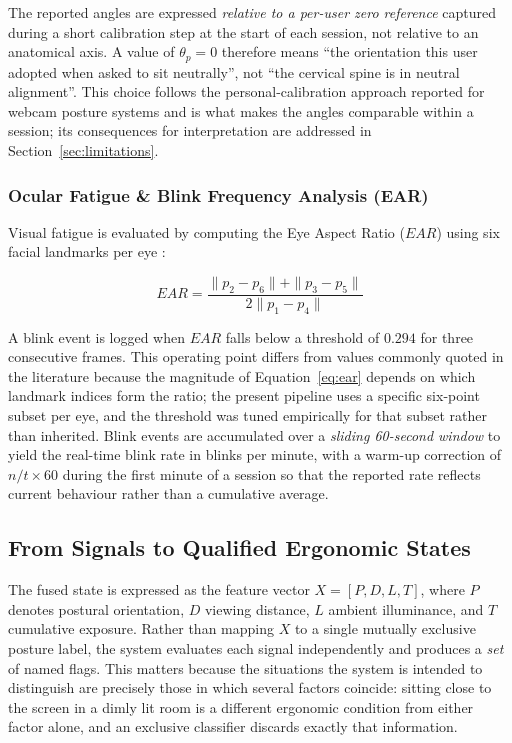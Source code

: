 The reported angles are expressed \emph{relative to a per-user zero reference} captured during a
short calibration step at the start of each session, not relative to an anatomical axis. A value of
$\theta_p = 0$ therefore means ``the orientation this user adopted when asked to sit neutrally'',
not ``the cervical spine is in neutral alignment''. This choice follows the personal-calibration
approach reported for webcam posture systems \cite{ref19} and is what makes the angles comparable
within a session; its consequences for interpretation are addressed in
Section~\ref{sec:limitations}.

\subsubsection{Ocular Fatigue \& Blink Frequency Analysis (EAR)}
Visual fatigue is evaluated by computing the Eye Aspect Ratio ($EAR$) using six facial landmarks
per eye \cite{ear_blinking}:

\begin{equation}
EAR = \frac{\|p_2 - p_6\| + \|p_3 - p_5\|}{2 \|p_1 - p_4\|}
\label{eq:ear}
\end{equation}

A blink event is logged when $EAR$ falls below a threshold of $0.294$ for three consecutive frames.
This operating point differs from values commonly quoted in the literature because the magnitude of
Equation~\ref{eq:ear} depends on which landmark indices form the ratio; the present pipeline uses a
specific six-point subset per eye, and the threshold was tuned empirically for that subset rather
than inherited. Blink events are accumulated over a \emph{sliding 60-second window} to yield the
real-time blink rate in blinks per minute, with a warm-up correction of $n/t \times 60$ during the
first minute of a session so that the reported rate reflects current behaviour rather than a
cumulative average.

\subsection{From Signals to Qualified Ergonomic States}
\label{subsec:qualification}

The fused state is expressed as the feature vector $X = [P, D, L, T]$, where $P$ denotes postural
orientation, $D$ viewing distance, $L$ ambient illuminance, and $T$ cumulative exposure. Rather
than mapping $X$ to a single mutually exclusive posture label, the system evaluates each signal
independently and produces a \emph{set} of named flags. This matters because the situations the
system is intended to distinguish are precisely those in which several factors coincide: sitting
close to the screen in a dimly lit room is a different ergonomic condition from either factor
alone, and an exclusive classifier discards exactly that information.

